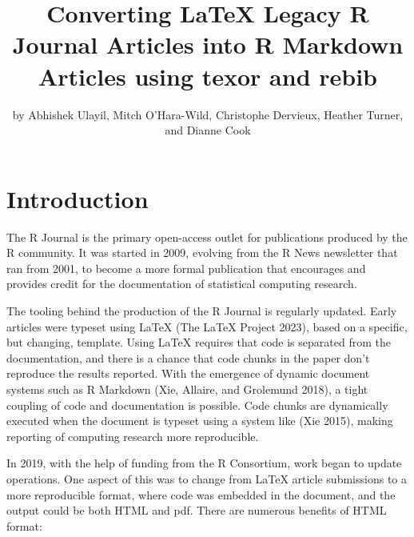 \title{Converting LaTeX Legacy R Journal Articles into R Markdown Articles using texor and rebib}


\author{by Abhishek Ulayil, Mitch O'Hara-Wild, Christophe Dervieux, Heather Turner, and Dianne Cook}

\maketitle


\hypertarget{introduction}{%
\section{Introduction}\label{introduction}}

The R Journal is the primary open-access outlet for publications produced by the R community. It was started in 2009, evolving from the R News newsletter that ran from 2001, to become a more formal publication that encourages and provides credit for the documentation of statistical computing research.

The tooling behind the production of the R Journal is regularly updated. Early articles were typeset using LaTeX (The LaTeX Project 2023), based on a specific, but changing, template. Using LaTeX requires that code is separated from the documentation, and there is a chance that code chunks in the paper don't reproduce the results reported. With the emergence of dynamic document systems such as R Markdown (Xie, Allaire, and Grolemund 2018), a tight coupling of code and documentation is possible. Code chunks are dynamically executed when the document is typeset using a system like  (Xie 2015), making reporting of computing research more reproducible.

In 2019, with the help of funding from the R Consortium, work began to update operations. One aspect of this was to change from LaTeX article submissions to a more reproducible format, where code was embedded in the document, and the output could be both HTML and pdf. There are numerous benefits of HTML format:


